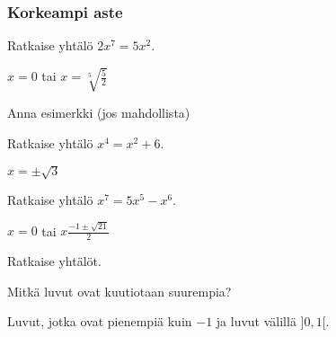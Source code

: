 \subsubsection*{Korkeampi aste}

\begin{tehtava} 
Ratkaise yhtälö $2x^7=5x^2$.
    \begin{vastaus}
		$x=0$ tai $x=\sqrt[5]{\frac{5}{2}}$
    \end{vastaus}
\end{tehtava}

\begin{tehtava} 
Anna esimerkki (jos mahdollista)
    \begin{vastaus}
    \end{vastaus}
\end{tehtava}

\begin{tehtava} 
Ratkaise yhtälö $x^4=x^2+6$.
    \begin{vastaus}
		$x=\pm \sqrt{3}$
    \end{vastaus}
\end{tehtava}

\begin{tehtava} 
Ratkaise yhtälö
$x^7=5x^5-x^6$.
     \begin{vastaus}
		$x=0$ tai $x\frac{-1 \pm \sqrt{21}}{2}$ 
    \end{vastaus}
\end{tehtava}

\begin{tehtava}
    Ratkaise yhtälöt.
    \begin{vastaus}
    \end{vastaus}
\end{tehtava}

\begin{tehtava}
Mitkä luvut ovat kuutiotaan suurempia?
    \begin{vastaus}
	Luvut, jotka ovat pienempiä kuin $-1$ ja luvut välillä $]0,1[$.
    \end{vastaus}
\end{tehtava}

